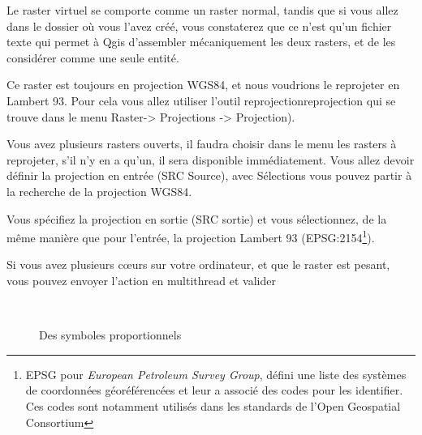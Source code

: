 \documentclass[a4paper, 11pt]{article}
\begin{document}
    Le raster virtuel se comporte comme un raster normal, tandis que si vous allez dans le dossier où vous l'avez créé, vous constaterez que ce n'est qu'un fichier texte qui permet à Qgis d'assembler mécaniquement les deux rasters, et de les considérer comme une seule entité.

    Ce raster est toujours en projection WGS84, et nous voudrions le reprojeter en Lambert 93. Pour cela vous allez utiliser l'outil reprojectionreprojection qui se trouve dans le menu Raster-> Projections -> Projection).

    Vous avez plusieurs rasters ouverts, il faudra choisir dans le menu les rasters à reprojeter, s'il n'y en a qu'un, il sera disponible immédiatement. Vous allez devoir définir la projection en entrée (SRC Source), avec Sélections vous pouvez partir à la recherche de la projection WGS84.

    Vous spécifiez la projection en sortie (SRC sortie) et vous sélectionnez, de la même manière que pour l'entrée, la projection Lambert 93 (EPSG:2154\footnote{EPSG pour \textit{European Petroleum Survey Group}, défini une liste des systèmes de coordonnées géoréférencées et leur a associé des codes pour les identifier. Ces codes sont notamment utilisés dans les standards de l'Open Geospatial Consortium}).

    Si vous avez plusieurs cœurs sur votre ordinateur, et que le raster est pesant, vous pouvez envoyer l'action en multithread et valider

    \begin{figure}
    \centering
    \\
      \caption{Des symboles proportionnels}\label{fig:analyseThematique}
    \end{figure}
\end{document}
